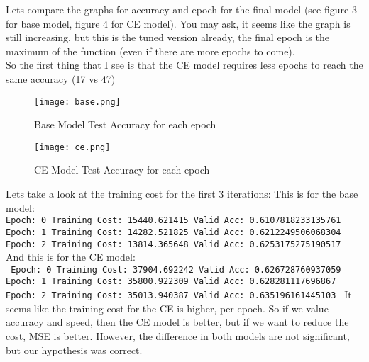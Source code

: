 \documentclass{article}
\begin{document}
\begin{enumerate}
Lets compare the graphs for accuracy and epoch for the final model (see figure 3 for base model, figure 4 for CE model). You may ask, it seems like the graph is still increasing, but this is the tuned version already, the final epoch is the maximum of the function (even if there are more epochs to come). \\
So the first thing that I see is that the CE model requires less epochs to reach the same accuracy (17 vs 47)  \\
    \begin{figure}[ht!]
                \centering
                \texttt{[image: base.png]}
                \caption{Base Model Test Accuracy for each epoch}
                \label{f:figure 3}
            \end{figure}
                \begin{figure}[ht!]
                \centering
                \texttt{[image: ce.png]}
                \caption{CE Model Test Accuracy for each epoch}
                \label{f:figure 4}
            \end{figure}
Lets take a look at the training cost for the first 3 iterations: This is for the base model:
\texttt{\\
Epoch: 0 	Training Cost: 15440.621415	 Valid Acc: 0.6107818233135761 \\
Epoch: 1 	Training Cost: 14282.521825	 Valid Acc: 0.6212249506068304 \\
Epoch: 2 	Training Cost: 13814.365648	 Valid Acc: 0.6253175275190517} \\
And this is for the CE model:\\
\texttt{
Epoch: 0 	Training Cost: 37904.692242	 Valid Acc: 0.626728760937059 \\
Epoch: 1 	Training Cost: 35800.922309	 Valid Acc: 0.628281117696867 \\
Epoch: 2 	Training Cost: 35013.940387	 Valid Acc: 0.635196161445103 
}
It seems like the training cost for the CE is higher, per epoch. So if we value accuracy and speed, then the CE model is better, but if we want to reduce the cost, MSE is better. However, the difference in both models are not significant, but our hypothesis was correct.\\


\end{enumerate}
\end{document}

